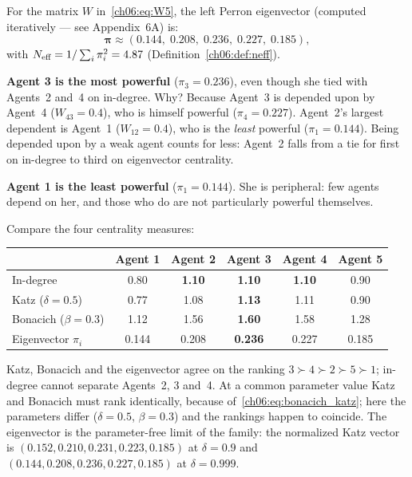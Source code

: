 \documentclass[../structural_economics_book.tex]{subfiles}
\begin{document}
\begin{example}\label{ch06:ex:five_power}
For the matrix $W$ in~\eqref{ch06:eq:W5}, the left Perron eigenvector (computed iteratively --- see Appendix~6A) is:
\begin{equation}
\boldsymbol{\pi} \approx (0.144, \; 0.208, \; 0.236, \; 0.227, \; 0.185),
\end{equation}
with $N_{\text{eff}} = 1/\sum_i \pi_i^2 = 4.87$ (Definition~\ref{ch06:def:neff}).

\textbf{Agent 3 is the most powerful} ($\pi_3 = 0.236$), even though she tied with Agents~2 and~4 on in-degree. Why? Because Agent~3 is depended upon by Agent~4 ($W_{43} = 0.4$), who is himself powerful ($\pi_4 = 0.227$). Agent~2's largest dependent is Agent~1 ($W_{12} = 0.4$), who is the \textit{least} powerful ($\pi_1 = 0.144$). Being depended upon by a weak agent counts for less: Agent~2 falls from a tie for first on in-degree to third on eigenvector centrality.

\textbf{Agent 1 is the least powerful} ($\pi_1 = 0.144$). She is peripheral: few agents depend on her, and those who do are not particularly powerful themselves.

Compare the four centrality measures:

\begin{center}
\begin{tabular}{lccccc}
\toprule
& Agent 1 & Agent 2 & Agent 3 & Agent 4 & Agent 5 \\
\midrule
In-degree & 0.80 & \textbf{1.10} & \textbf{1.10} & \textbf{1.10} & 0.90 \\
Katz ($\delta = 0.5$) & 0.77 & 1.08 & \textbf{1.13} & 1.11 & 0.90 \\
Bonacich ($\beta = 0.3$) & 1.12 & 1.56 & \textbf{1.60} & 1.58 & 1.28 \\
Eigenvector $\pi_i$ & 0.144 & 0.208 & \textbf{0.236} & 0.227 & 0.185 \\
\bottomrule
\end{tabular}
\end{center}

Katz, Bonacich and the eigenvector agree on the ranking $3 \succ 4 \succ 2 \succ 5 \succ 1$; in-degree cannot separate Agents~2, 3 and~4. At a common parameter value Katz and Bonacich must rank identically, because of~\eqref{ch06:eq:bonacich_katz}; here the parameters differ ($\delta = 0.5$, $\beta = 0.3$) and the rankings happen to coincide. The eigenvector is the parameter-free limit of the family: the normalized Katz vector is $(0.152, 0.210, 0.231, 0.223, 0.185)$ at $\delta = 0.9$ and $(0.144, 0.208, 0.236, 0.227, 0.185)$ at $\delta = 0.999$.
\end{example}
\end{document}
